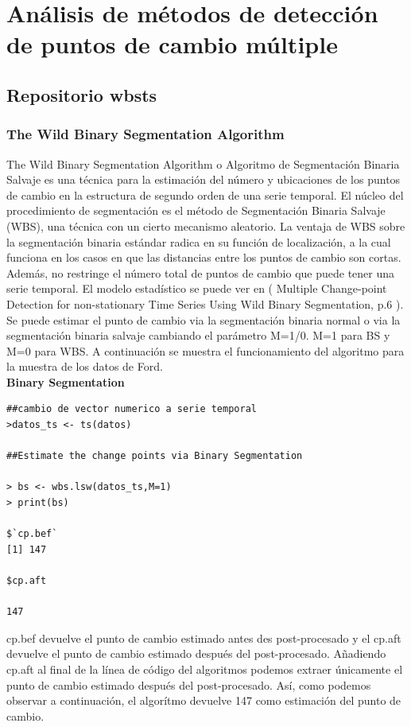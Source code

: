 \documentclass[runningheads,a4paper,12pt]{report}
\begin{document}
\newpage

\section{Análisis de métodos de detección de puntos de cambio múltiple}
\subsection{Repositorio wbsts \cite{wbsts}}
\subsubsection{The Wild Binary Segmentation Algorithm}
The Wild Binary Segmentation Algorithm o Algoritmo de Segmentación Binaria Salvaje es una técnica para la estimación del número y ubicaciones de los puntos de cambio en la estructura de segundo orden de una serie temporal. El núcleo del procedimiento de segmentación es el método de Segmentación Binaria Salvaje (WBS), una técnica con un cierto mecanismo aleatorio. La ventaja de WBS sobre la segmentación binaria estándar radica en su función de localización, a la cual funciona en los casos en que las distancias entre los puntos de cambio son cortas. Además, no restringe el número total de puntos de cambio que puede tener una serie temporal.  El modelo estadístico se puede ver en ( Multiple Change-point Detection for non-stationary Time Series Using Wild Binary Segmentation, p.6 \cite{wbsts}).\\
Se puede estimar el punto de cambio via la segmentación binaria normal o via la segmentación binaria salvaje cambiando el parámetro M=1/0. M=1 para BS y M=0 para WBS. A continuación se muestra el funcionamiento del algoritmo para la muestra de los datos de Ford.\\

\textbf{Binary Segmentation}

\begin{lstlisting}
##cambio de vector numerico a serie temporal
>datos_ts <- ts(datos)

##Estimate the change points via Binary Segmentation

> bs <- wbs.lsw(datos_ts,M=1)
> print(bs)

$`cp.bef`
[1] 147

$cp.aft
    
147 

\end{lstlisting}
\newpage
cp.bef devuelve el punto de cambio estimado antes des post-procesado y el cp.aft devuelve el punto de cambio estimado después del post-procesado. Añadiendo cp.aft al final de la línea de código del algoritmos podemos extraer únicamente el punto de cambio estimado después del post-procesado. Así, como podemos observar a continuación,  el algorítmo devuelve 147 como estimación del punto de cambio.\\
\end{document}
